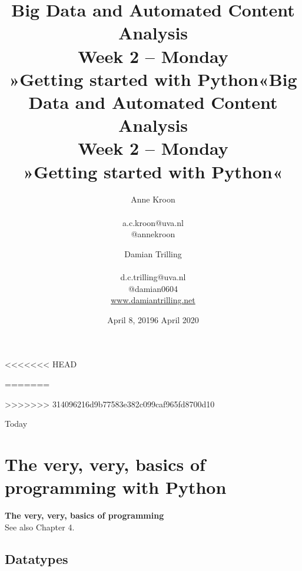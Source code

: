 \documentclass{beamer}
\begin{document}
<<<<<<< HEAD
\title[Big Data and Automated Content Analysis]{\textbf{Big Data and Automated Content Analysis} \\ Week 2 -- Monday\\ »Getting started with Python«}
\author[Anne Kroon]{Anne Kroon \\ ~ \\ \footnotesize{a.c.kroon@uva.nl \\@annekroon} \\}
\date{April 8, 2019}
=======
\title[Big Data and Automated Content Analysis]{\textbf{Big Data and Automated Content Analysis} \\ Week 2 -- Monday \\ »Getting started with Python«}
\author[Damian Trilling]{Damian Trilling \\ ~ \\ \footnotesize{d.c.trilling@uva.nl \\@damian0604} \\ \url{www.damiantrilling.net}}
\date{6 April 2020}
>>>>>>> 314096216d9b77583e382c099caf965fd8700d10




\begin{frame}{}
\titlepage
\end{frame}

\begin{frame}{Today}
\tableofcontents
\end{frame}


\section[Basics]{The very, very, basics of programming with Python}
\begin{frame}[plain]
\textbf{The very, very, basics of programming}\\
\vspace{1cm}
See also Chapter 4.
\end{frame}
\subsection{Datatypes}
\end{document}
